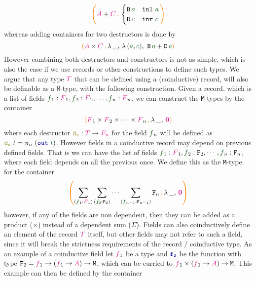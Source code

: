 \documentclass[twoside,11pt,openright]{report}
\theoremstyle{plain} %
\theoremstyle{definition}
\theoremstyle{remark}
\newcommand*{\term}[1]{\textcolor{green!30!black}{#1}} %
\newcommand*{\type}[1]{\textcolor{magenta!90!black}{#1}}
\newcommand*{\containerpair}[2]{\ensuremath{\colorlet{savedleftcolor}{.}\color{orange}\left(\color{savedleftcolor}#1\,\textcolor{orange}{\mathbf{,}}\,#2\color{orange}\right)\color{savedleftcolor}}}
\newcommand*{\containerpairsimple}[2]{\containerpair{#1}{\lambda\,\_,\,#2}}
\newcommand*{\empt}{\type{\textbf{0}}}
\newcommand*{\function}[1]{\textcolor{blue!60!black}{\ensuremath{\mathtt{#1}}}}
\newcommand*{\destructor}[1]{\textcolor{yellow!60!black}{\ensuremath{\mathtt{#1}}}}
\newcommand*{\typeformer}[1]{\ensuremath{\mathtt{#1}}}
\begin{document}
\begin{equation}
  \containerpair{\type{A} + \type{C}}{ \begin{cases} \typeformer{B}\,\term{a} & \mathtt{inl}~\term{a} \\ \typeformer{D}\,\term{c} & \mathtt{inr}~\term{c} \end{cases}}
\end{equation}
whereas adding containers for two destructors is done by
\begin{equation}
  \containerpairsimple{\type{A} \times \type{C}}{\lambda\,(\term{a},\term{c}),~\typeformer{B}\,\term{a} + \typeformer{D}\,\term{c}}  
\end{equation}
However combining both destructors and constructors is not as simple, which is also the case if we use records or other constructions to define such types. We argue that any type \(\type{T}\) that can be defined using a (coinductive) record, will also be definable as a \texttt{M}-type, with the following construction. Given a record, which is a list of fields \(\term{f}_1 : \type{F}_1,\term{f}_2 : \type{F}_2,\dots,\term{f}_n : \type{F}_n\), we can construct the \texttt{M}-types by the container
\begin{equation}
  \containerpairsimple{\type{F}_1 \times \type{F}_2 \times \dots \times \type{F}_n}{\empt}
\end{equation}
where each destructor \(\destructor{d_n} : \type{T} \rightarrow \type{F_n}\) for the field \(\term{f}_n\) will be defined as \(\destructor{d_n}~\term{t} = \pi_n~(\function{out}~\term{t})\). However fields in a coinductive record may depend on previous defined fields. That is we can have the list of fields \(\term{f}_1 : \type{F}_1,\term{f}_2 : \typeformer{F}_2,\cdots,\term{f}_n : \typeformer{F}_n\), where each field depends on all the previous once. We define this as the \texttt{M}-type for the container
\begin{equation}
  \containerpairsimple{\sum_{(\term{f}_1 : \type{F}_1)} \sum_{(\term{f_2} : \typeformer{F}_2)} \cdots \sum_{(\term{f}_{n-1} : \typeformer{F}_{n-1})}\typeformer{F}_n}{\empt}
\end{equation}
however, if any of the fields are non dependent, then they can be added as a product (\(\times\)) instead of a dependent sum (\(\Sigma\)). Fields can also coinductively define an element of the record \(\type{T}\) itself, but other fields may not refer to such a field, since it will break the strictness requirements of the record / coinductive type. As an example of a coinductive field let \(\type{f}_1\) be a type and \(\function{f_2}\) be the function with type \(\typeformer{F}_2 = \type{f}_1 \rightarrow (\type{f}_1 \rightarrow \type{A}) \rightarrow \typeformer{M}\), which can be curried to \(\type{f}_1 \times (\type{f}_1 \rightarrow \type{A}) \rightarrow \typeformer{M}\). This example can then be defined by the container
\end{document}
